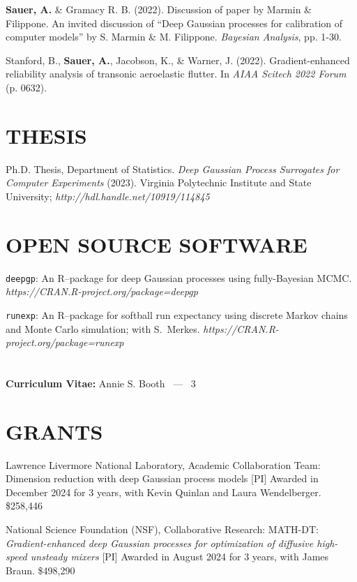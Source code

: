 \documentclass[margin,line,11pt]{res}
\begin{document}
\begin{resume}
{\bf Sauer, A.} \& Gramacy R. B. (2022). Discussion of paper by Marmin \& Filippone.  An
invited discussion of ``Deep Gaussian processes for calibration of computer models''
by S. Marmin \& M. Filippone. {\it Bayesian Analysis}, pp. 1-30.

Stanford, B., {\bf Sauer, A.}, Jacobson, K., \& Warner, J. (2022). 
Gradient-enhanced reliability analysis of transonic aeroelastic 
flutter. In {\it AIAA Scitech 2022 Forum} (p. 0632).

\medskip
\section{\bf THESIS}

Ph.D. Thesis, Department of Statistics.  {\it Deep Gaussian Process
Surrogates for Computer Experiments} (2023). Virginia Polytechnic Institute
and State University; {\it http://hdl.handle.net/10919/114845}

\medskip
\section{\bf OPEN SOURCE SOFTWARE}

{\tt deepgp}: An {\sf R}--package for deep Gaussian processes 
using fully-Bayesian MCMC.\\
{\sl https://CRAN.R-project.org/package=deepgp}

{\tt runexp}: An {\sf R}--package for softball run expectancy using 
discrete Markov chains and Monte Carlo simulation; with S.~Merkes.
{\sl https://CRAN.R-project.org/package=runexp}

\pagebreak
\section{}
\hfill {\bf Curriculum Vitae:} Annie S. Booth \  --- \  3
\medskip

\section{\bf GRANTS}

Lawrence Livermore National Laboratory, Academic Collaboration Team: Dimension reduction with 
deep Gaussian process models [PI] Awarded in December 2024 for 3 years, with Kevin Quinlan
and Laura Wendelberger. \hfill \$258,446

National Science Foundation (NSF), Collaborative Research: MATH-DT: {\it Gradient-enhanced
deep Gaussian processes for optimization of diffusive high-speed unsteady mixers} [PI]
Awarded in August 2024 for 3 years, with James Braun.  \hfill \$498,290


\end{resume}
\end{document}
